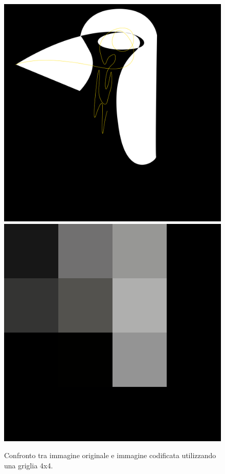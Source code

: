 \begin{figure}[htb] \centering
\includegraphics[scale=0.08]{Pictures/in ricordo del pinguino cameriere.png}
\qquad\qquad
\includegraphics[scale=0.08]{Pictures/canvas8x8.png}
\caption{Confronto tra immagine originale e immagine codificata utilizzando una griglia 4x4.}\label{fig:figura}
\end{figure}

